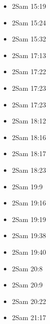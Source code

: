 \documentclass[14pt]{article}
\begin{document}
\begin{multicols}{2}
\begin{itemize}
							\item 2Sam 15:19
							
							\item 2Sam 15:24
							
							\item 2Sam 15:32
							
							\item 2Sam 17:13
							
							\item 2Sam 17:22
							
							\item 2Sam 17:23
							
							\item 2Sam 17:23
							
							\item 2Sam 18:12
							
							\item 2Sam 18:16
							
							\item 2Sam 18:17
							
							\item 2Sam 18:23
							
							\item 2Sam 19:9
							
							\item 2Sam 19:16
							
							\item 2Sam 19:19
							
							\item 2Sam 19:38
							
							\item 2Sam 19:40
							
							\item 2Sam 20:8
							
							\item 2Sam 20:9
							
							\item 2Sam 20:22
							
							\item 2Sam 21:17
							

\end{itemize}
\end{multicols}
\end{document}
